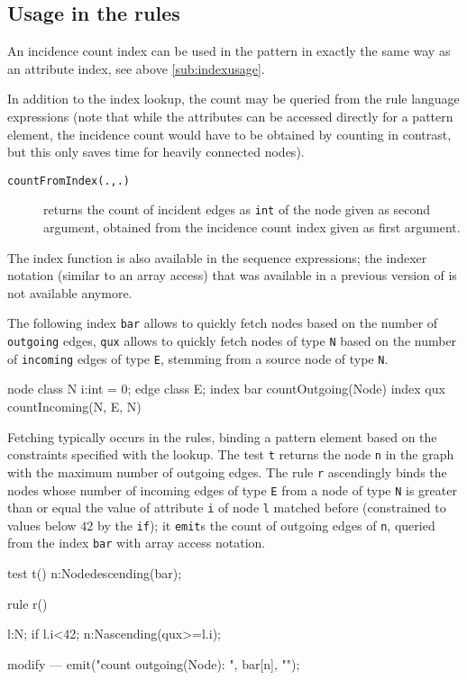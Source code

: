 \subsection*{Usage in the rules}
An incidence count index can be used in the pattern in exactly the same way as an attribute index, see above \ref{sub:indexusage}.

In addition to the index lookup, the count may be queried from the rule language expressions (note that while the attributes can be accessed directly for a pattern element, the incidence count would have to be obtained by counting in contrast, but this only saves time for heavily connected nodes).

\begin{description}
\item[\texttt{countFromIndex(.,.)}] returns the count of incident edges as \texttt{int} of the node given as second argument, obtained from the incidence count index given as first argument.
\end{description}

The index function is also available in the sequence expressions; the indexer notation (similar to an array access) that was available in a previous version of \GrG{} is not available anymore.


\begin{example}
The following index \texttt{bar} allows to quickly fetch nodes based on the number of \texttt{outgoing} edges, \texttt{qux} allows to quickly fetch nodes of type \texttt{N} based on the number of \texttt{incoming} edges of type \texttt{E}, stemming from a source node of type \texttt{N}.

\begin{grgen}
node class N {
	i:int = 0;
}
edge class E;
index bar { countOutgoing(Node) }
index qux { countIncoming(N, E, N) }
\end{grgen}

Fetching typically occurs in the rules, binding a pattern element based on the constraints specified with the lookup.
The test \texttt{t} returns the node \texttt{n} in the graph with the maximum number of outgoing edges.
The rule \texttt{r} ascendingly binds the nodes whose number of incoming edges of type \texttt{E} from a node of type \texttt{N} is greater than or equal the value of attribute \texttt{i} of node \texttt{l} matched before (constrained to values below $42$ by the \texttt{if}); it \texttt{emit}s the count of outgoing edges of \texttt{n}, queried from the index \texttt{bar} with array access notation.

\begin{grgen}
test t() {
	n:Node{descending(bar)};
}

rule r() {
  l:N; if{ l.i<42;}
  n:N{ascending(qux>=l.i)};
	
  modify {
  ---
    emit("count outgoing(Node): ", bar[n], "\n");
  }
}
\end{grgen}

\end{example}



